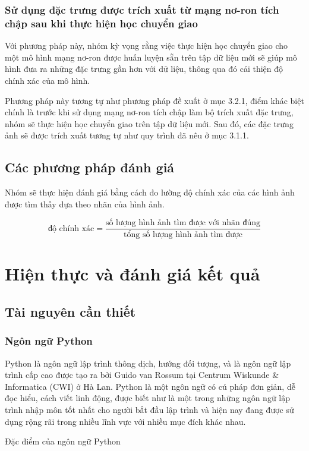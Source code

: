 \documentclass[a4paper,14pt]{extreport}
\begin{document}
\subsection{Sử dụng đặc trưng được trích xuất từ mạng nơ-ron tích chập sau khi thực hiện học chuyển giao }

Với phương pháp này, nhóm kỳ vọng rằng việc thực hiện học chuyển giao cho một mô hình mạng nơ-ron 
được huấn luyện sẵn trên tập dữ liệu mới sẽ giúp mô hình đưa ra những đặc trưng gần hơn với dữ liệu, 
thông qua đó cải thiện độ chính xác của mô hình.

Phương pháp này tương tự như phương pháp đề xuất ở mục 3.2.1, điểm khác biệt chính là trước khi sử dụng mạng nơ-ron tích chập làm bộ trích xuất đặc trưng, nhóm sẽ thực hiện học chuyển giao trên tập dữ liệu mới. Sau đó, các đặc trưng ảnh sẽ được trích xuất tương tự như quy trình đã nêu ở mục 3.1.1.

\section{ Các phương pháp đánh giá }
Nhóm sẽ thực hiện đánh giá bằng cách đo lường độ chính xác của các hình ảnh được tìm thấy dựa theo nhãn 
của hình ảnh.

\[ \text{độ chính xác} = \frac{\text{số lượng hình ảnh tìm được với nhãn đúng}}{\text{tổng số lượng hình ảnh tìm được}} \]
\chapter{Hiện thực và đánh giá kết quả}
\section{Tài nguyên cần thiết}
\subsection{Ngôn ngữ Python}

Python là ngôn ngữ lập trình thông dịch, hướng đối tượng, và là ngôn ngữ lập trình cấp cao được tạo ra bởi Guido van Rossum tại Centrum Wiskunde & Informatica (CWI) ở Hà Lan. Python là một ngôn ngữ có cú pháp đơn giản, dễ đọc hiểu, cách viết linh động, được biết như là một trong những ngôn ngữ lập trình nhập môn tốt nhất cho người bắt đầu lập trình và hiện nay đang được sử dụng rộng rãi trong nhiều lĩnh vực với nhiều mục đích khác nhau.


Đặc điểm của ngôn ngữ Python
\end{document}
